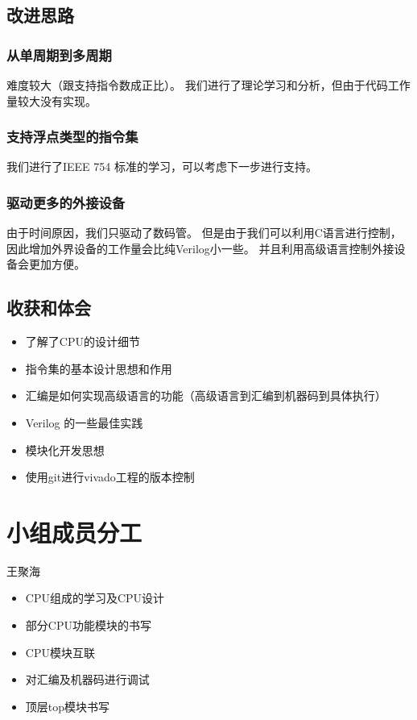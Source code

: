 \documentclass[UTF8]{article}
\begin{document}
\subsection{改进思路}
\subsubsection{从单周期到多周期}
  
难度较大（跟支持指令数成正比）。
我们进行了理论学习和分析，但由于代码工作量较大没有实现。
  
\subsubsection{支持浮点类型的指令集}
我们进行了IEEE 754 标准的学习，可以考虑下一步进行支持。
  
\subsubsection{驱动更多的外接设备}
由于时间原因，我们只驱动了数码管。
但是由于我们可以利用C语言进行控制，
因此增加外界设备的工作量会比纯Verilog小一些。
并且利用高级语言控制外接设备会更加方便。

\subsection{收获和体会}

\begin{itemize}
\item 了解了CPU的设计细节
\item 指令集的基本设计思想和作用
\item 汇编是如何实现高级语言的功能（高级语言到汇编到机器码到具体执行）
\item Verilog 的一些最佳实践
\item 模块化开发思想
\item 使用git进行vivado工程的版本控制
\end{itemize}


\section{小组成员分工}
王聚海

\begin{itemize}
    \item CPU组成的学习及CPU设计
\item 部分CPU功能模块的书写
\item CPU模块互联
\item 对汇编及机器码进行调试
\item 顶层top模块书写
\end{itemize}
\end{document}

